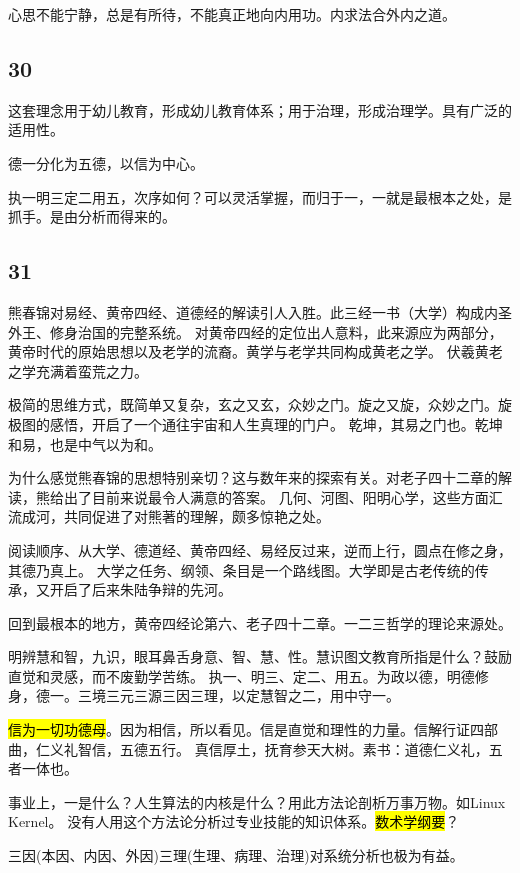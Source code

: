 心思不能宁静，总是有所待，不能真正地向内用功。内求法合外内之道。

\subsection{30}

这套理念用于幼儿教育，形成幼儿教育体系；用于治理，形成治理学。具有广泛的适用性。

德一分化为五德，以信为中心。

执一明三定二用五，次序如何？可以灵活掌握，而归于一，一就是最根本之处，是抓手。是由分析而得来的。

\subsection{31}

熊春锦对易经、黄帝四经、道德经的解读引人入胜。此三经一书（大学）构成内圣外王、修身治国的完整系统。
对黄帝四经的定位出人意料，此来源应为两部分，黄帝时代的原始思想以及老学的流裔。黄学与老学共同构成黄老之学。
伏羲黄老之学充满着蛮荒之力。

极简的思维方式，既简单又复杂，玄之又玄，众妙之门。旋之又旋，众妙之门。旋极图的感悟，开启了一个通往宇宙和人生真理的门户。
乾坤，其易之门也。乾坤和易，也是中气以为和。

为什么感觉熊春锦的思想特别亲切？这与数年来的探索有关。对老子四十二章的解读，熊给出了目前来说最令人满意的答案。
几何、河图、阳明心学，这些方面汇流成河，共同促进了对熊著的理解，颇多惊艳之处。

阅读顺序、从大学、德道经、黄帝四经、易经反过来，逆而上行，圆点在修之身，其德乃真上。
大学之任务、纲领、条目是一个路线图。大学即是古老传统的传承，又开启了后来朱陆争辩的先河。

回到最根本的地方，黄帝四经论第六、老子四十二章。一二三哲学的理论来源处。

明辨慧和智，九识，眼耳鼻舌身意、智、慧、性。慧识图文教育所指是什么？鼓励直觉和灵感，而不废勤学苦练。
执一、明三、定二、用五。为政以德，明德修身，德一。三境三元三源三因三理，以定慧智之二，用中守一。

\hl{信为一切功德母}。因为相信，所以看见。信是直觉和理性的力量。信解行证四部曲，仁义礼智信，五德五行。
真信厚土，抚育参天大树。素书：道德仁义礼，五者一体也。

事业上，一是什么？人生算法的内核是什么？用此方法论剖析万事万物。如Linux Kernel。
没有人用这个方法论分析过专业技能的知识体系。\hl{数术学纲要}？

三因(本因、内因、外因)三理(生理、病理、治理)对系统分析也极为有益。

